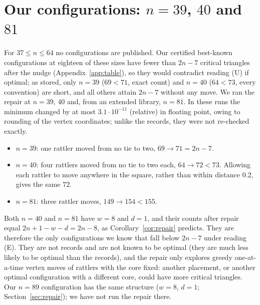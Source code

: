 \documentclass[11pt]{amsart}
\theoremstyle{definition}
\begin{document}
\section{Our configurations: \texorpdfstring{$n = 39$, $40$ and $81$}{n = 39, 40 and 81}}\label{sec:ours}

For $37 \le n \le 64$ no configurations are published. Our certified best-known configurations at eighteen of these sizes have fewer than $2n-7$ critical triangles after the nudge (Appendix~\ref{app:table}), so they would contradict reading (U) if optimal; as stored, only $n = 39$ ($69 < 71$, exact count) and $n = 40$ ($64 < 73$, every convention) are short, and all others attain $2n-7$ without any move. %
We ran the repair at $n = 39$, $40$ and, from an extended library, $n = 81$. In these runs the minimum changed by at most $3.1\cdot10^{-11}$ (relative) in floating point, owing to rounding of the vertex coordinates; unlike the records, they were not re-checked exactly. %
\begin{itemize}
\item $n = 39$: one rattler moved from no tie to two, $69 \to 71 = 2n-7$.
\item $n = 40$: four rattlers moved from no tie to two each, $64 \to 72 < 73$. Allowing each rattler to move anywhere in the square, rather than within distance $0.2$, gives the same $72$.
\item $n = 81$: three rattler moves, $149 \to 154 < 155$.
\end{itemize}
Both $n = 40$ and $n = 81$ have $w = 8$ and $d = 1$, and their counts after repair equal $2n + 1 - w - d = 2n - 8$, as Corollary~\ref{cor:repair} predicts. They are therefore the only configurations we know that fall below $2n-7$ under reading (E). They are not records and are not known to be optimal (they are much less likely to be optimal than the records), and the repair only explores greedy one-at-a-time vertex moves of rattlers with the core fixed: another placement, or another optimal configuration with a different core, could have more critical triangles. Our $n = 89$ configuration has the same structure ($w = 8$, $d = 1$; Section~\ref{sec:repair}); we have not run the repair there.
\end{document}
